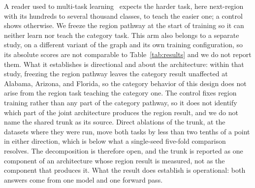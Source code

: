 A reader used to multi-task learning~\cite{caruana1997multitask} expects the
harder task, here next-region with its hundreds to several thousand classes, to teach the easier one; a control shows otherwise. We freeze the region pathway at the start of training so it can neither learn nor teach the category
task. This arm also belongs to a separate study, on a different variant of the graph and its own
training configuration, so its absolute scores are not comparable to Table~\ref{tab:results} and we
do not report them. What it establishes is directional and about the architecture: within that study,
freezing the region pathway leaves the category result unaffected at Alabama, Arizona, and Florida,
so the category behavior of this design does not arise from the region task teaching the category
one. The control fixes region training rather than any part of the category pathway, so it does not
identify which part of the joint architecture produces the region result, and we do not name the
shared trunk as its source. Direct ablations of the trunk, at the datasets where they were run,
move both tasks by less than two tenths of a point in either direction, which is below what a
single-seed five-fold comparison resolves. The decomposition is therefore open, and the trunk is
reported as one component of an architecture whose region result is measured, not as the component
that produces it. What the result does establish is operational: both answers come from one model
and one forward pass.


